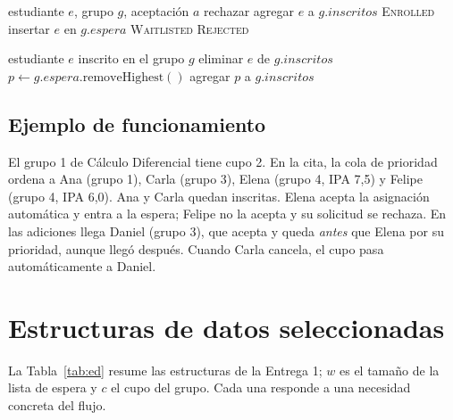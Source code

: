 \documentclass[conference]{IEEEtran}
\begin{document}
\begin{algorithm}[htbp]
\caption{Solicitar un grupo (\texttt{request})}
\label{alg:request}
\begin{algorithmic}[1]
\Require estudiante $e$, grupo $g$, aceptación $a$
 \State rechazar \EndIf
{}
    \State agregar $e$ a $g.\mathit{inscritos}$ 
    \State \Return \textsc{Enrolled}
    \State insertar $e$ en $g.\mathit{espera}$ 
    \State \Return \textsc{Waitlisted}
\Else
    \State \Return \textsc{Rejected}
\EndIf
\end{algorithmic}
\end{algorithm}

\begin{algorithm}[htbp]
\caption{Cancelar y reasignar (\texttt{cancel})}
\label{alg:cancel}
\begin{algorithmic}[1]
\Require estudiante $e$ inscrito en el grupo $g$
\State eliminar $e$ de $g.\mathit{inscritos}$ 
    \State $p \gets g.\mathit{espera}.\mathrm{removeHighest}()$ 
    \State agregar $p$ a $g.\mathit{inscritos}$ 
\EndIf
\end{algorithmic}
\end{algorithm}

\subsection{Ejemplo de funcionamiento}
El grupo 1 de Cálculo Diferencial tiene cupo 2. En la cita, la cola de prioridad ordena a Ana (grupo 1), Carla (grupo 3), Elena (grupo 4, IPA 7,5) y Felipe (grupo 4, IPA 6,0). Ana y Carla quedan inscritas. Elena acepta la asignación automática y entra a la espera; Felipe no la acepta y su solicitud se rechaza. En las adiciones llega Daniel (grupo 3), que acepta y queda \emph{antes} que Elena por su prioridad, aunque llegó después. Cuando Carla cancela, el cupo pasa automáticamente a Daniel.


\section{Estructuras de datos seleccionadas}

La Tabla~\ref{tab:ed} resume las estructuras de la Entrega 1; $w$ es el tamaño de la lista de espera y $c$ el cupo del grupo. Cada una responde a una necesidad concreta del flujo.
\end{document}
